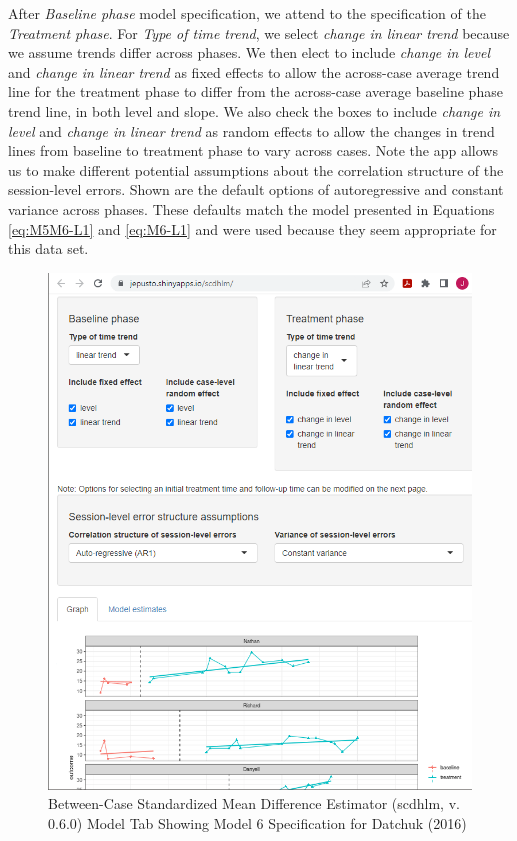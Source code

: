\documentclass[
]{book}
\begin{document}
After \emph{Baseline phase} model specification, we attend to the specification of the \emph{Treatment phase}. For \emph{Type of time trend}, we select \emph{change in linear trend} because we assume trends differ across phases. We then elect to include \emph{change in level} and \emph{change in linear trend} as fixed effects to allow the across-case average trend line for the treatment phase to differ from the across-case average baseline phase trend line, in both level and slope. We also check the boxes to include \emph{change in level} and \emph{change in linear trend} as random effects to allow the changes in trend lines from baseline to treatment phase to vary across cases. Note the app allows us to make different potential assumptions about the correlation structure of the session-level errors. Shown are the default options of autoregressive and constant variance across phases. These defaults match the model presented in Equations \eqref{eq:M5M6-L1} and \eqref{eq:M6-L1} and were used because they seem appropriate for this data set.

\begin{figure}
\includegraphics[width=0.6\linewidth]{images/app.model.model6_Datchuk2016} \caption{Between-Case Standardized Mean Difference Estimator (scdhlm, v. 0.6.0) Model Tab Showing Model 6 Specification for Datchuk (2016)}\label{fig:Datchuk-2016-model6}
\end{figure}
\end{document}
